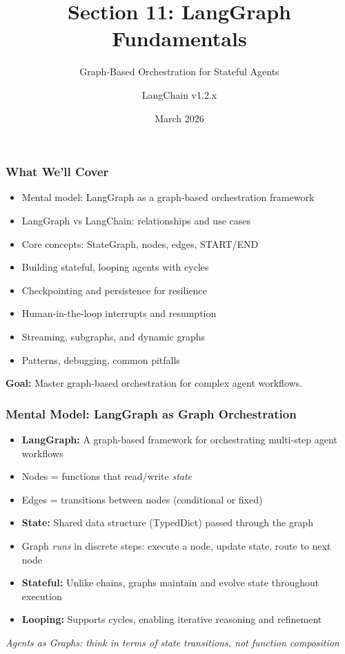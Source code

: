 \documentclass[aspectratio=169,11pt]{beamer}
\title{Section 11: LangGraph Fundamentals}
\subtitle{Graph-Based Orchestration for Stateful Agents}
\author{LangChain v1.2.x}
\date{March 2026}
\begin{document}
\frame{\titlepage}

\begin{frame}[fragile]
\frametitle{What We'll Cover}
\begin{itemize}
    \setlength{\itemsep}{1pt}
  \item Mental model: LangGraph as a graph-based orchestration framework
  \item LangGraph vs LangChain: relationships and use cases
  \item Core concepts: StateGraph, nodes, edges, START/END
  \item Building stateful, looping agents with cycles
  \item Checkpointing and persistence for resilience
  \item Human-in-the-loop interrupts and resumption
  \item Streaming, subgraphs, and dynamic graphs
  \item Patterns, debugging, common pitfalls
\end{itemize}
\vspace{10pt}
\textbf{Goal:} Master graph-based orchestration for complex agent workflows.
\end{frame}

\begin{frame}
\frametitle{Mental Model: LangGraph as Graph Orchestration}
\begin{itemize}
    \setlength{\itemsep}{1pt}
  \item \textbf{LangGraph:} A graph-based framework for orchestrating multi-step agent workflows
  \item Nodes = functions that read/write \textit{state}
  \item Edges = transitions between nodes (conditional or fixed)
  \item \textbf{State:} Shared data structure (TypedDict) passed through the graph
  \item Graph \textit{runs} in discrete steps: execute a node, update state, route to next node
  \item \textbf{Stateful:} Unlike chains, graphs maintain and evolve state throughout execution
  \item \textbf{Looping:} Supports cycles, enabling iterative reasoning and refinement
\end{itemize}
\vspace{10pt}
\begin{center}
  \textit{Agents as Graphs: think in terms of state transitions, not function composition}
\end{center}
\end{frame}
\end{document}
